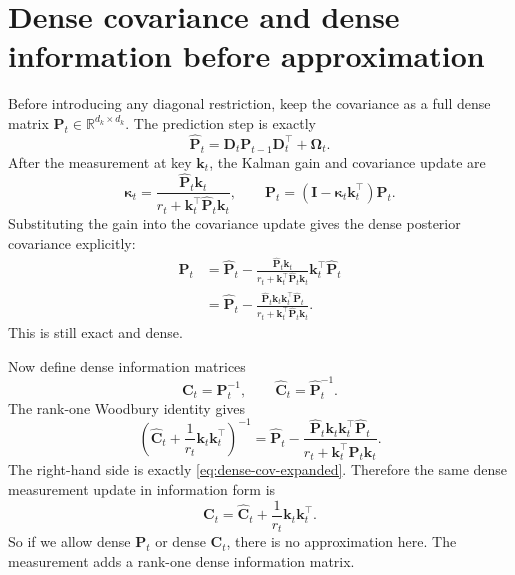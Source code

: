 \documentclass[11pt]{article}
\newcommand{\R}{\mathbb{R}}
\newcommand{\ve}[1]{\boldsymbol{#1}}
\newcommand{\tr}{\intercal}
\begin{document}
\section{Dense covariance and dense information before approximation}

Before introducing any diagonal restriction, keep the covariance as a full dense matrix
$\ve{P}_t\in\R^{d_k\times d_k}$. The prediction step is exactly
\begin{equation}
  \widehat{\ve{P}}_t
  =
  \ve{D}_t\ve{P}_{t-1}\ve{D}_t^{\tr}+\ve{\Omega}_t.
  \label{eq:dense-predict}
\end{equation}
After the measurement at key $\ve{k}_t$, the Kalman gain and covariance update are
\begin{equation}
  \ve{\kappa}_t
  =
  \frac{\widehat{\ve{P}}_t\ve{k}_t}
  {r_t+\ve{k}_t^{\tr}\widehat{\ve{P}}_t\ve{k}_t},
  \qquad
  \ve{P}_t
  =
  (\ve{I}-\ve{\kappa}_t\ve{k}_t^{\tr})\widehat{\ve{P}}_t.
  \label{eq:dense-cov-update}
\end{equation}
Substituting the gain into the covariance update gives the dense posterior covariance
explicitly:
\begin{equation}
\begin{aligned}
  \ve{P}_t
  &=
  \widehat{\ve{P}}_t
  -
  \frac{\widehat{\ve{P}}_t\ve{k}_t}
       {r_t+\ve{k}_t^{\tr}\widehat{\ve{P}}_t\ve{k}_t}
  \ve{k}_t^{\tr}\widehat{\ve{P}}_t \\
  &=
  \widehat{\ve{P}}_t
  -
  \frac{
    \widehat{\ve{P}}_t\ve{k}_t\ve{k}_t^{\tr}\widehat{\ve{P}}_t
  }
  {r_t+\ve{k}_t^{\tr}\widehat{\ve{P}}_t\ve{k}_t}.
\end{aligned}
  \label{eq:dense-cov-expanded}
\end{equation}
This is still exact and dense.

Now define dense information matrices
\[
  \ve{C}_t=\ve{P}_t^{-1},
  \qquad
  \widehat{\ve{C}}_t=\widehat{\ve{P}}_t^{-1}.
\]
The rank-one Woodbury identity gives
\begin{equation}
  \left(\widehat{\ve{C}}_t+\frac{1}{r_t}\ve{k}_t\ve{k}_t^{\tr}\right)^{-1}
  =
  \widehat{\ve{P}}_t
  -
  \frac{
    \widehat{\ve{P}}_t\ve{k}_t\ve{k}_t^{\tr}\widehat{\ve{P}}_t
  }
  {r_t+\ve{k}_t^{\tr}\widehat{\ve{P}}_t\ve{k}_t}.
  \label{eq:dense-woodbury}
\end{equation}
The right-hand side is exactly \eqref{eq:dense-cov-expanded}. Therefore the same dense
measurement update in information form is
\begin{equation}
  \boxed{
  \ve{C}_t
  =
  \widehat{\ve{C}}_t+\frac{1}{r_t}\ve{k}_t\ve{k}_t^{\tr}.
  }
  \label{eq:exact-info-update}
\end{equation}
So if we allow dense $\ve{P}_t$ or dense $\ve{C}_t$, there is no approximation here. The
measurement adds a rank-one dense information matrix.
\end{document}
